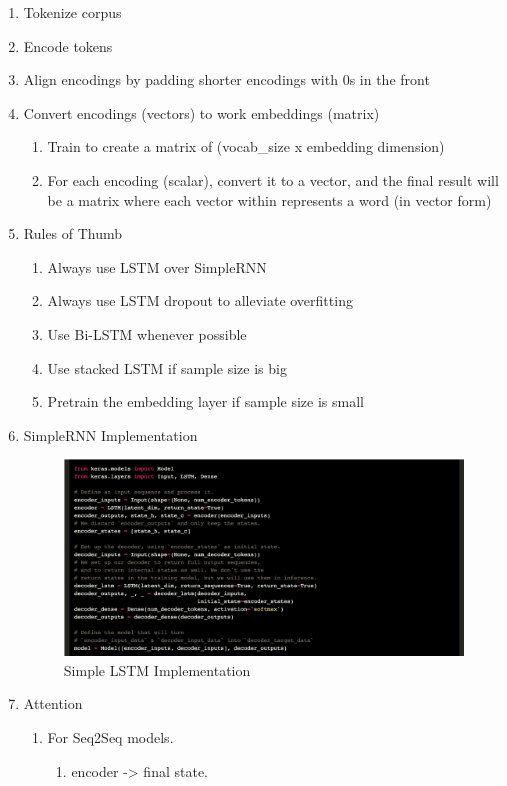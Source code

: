 \documentclass[11pt]{article}
\begin{document}
\begin{enumerate}
\item Tokenize corpus
\item Encode tokens
\item Align encodings by padding shorter encodings with 0s in the front
\item Convert encodings (vectors) to work embeddings (matrix)
\begin{enumerate}
\item Train to create a matrix of (vocab\_size x embedding dimension)
\item For each encoding (scalar), convert it to a vector, and the final result will be a matrix where each vector within represents a word (in vector form)
\end{enumerate}
\item Rules of Thumb
\begin{enumerate}
\item Always use LSTM over SimpleRNN
\item Always use LSTM dropout to alleviate overfitting
\item Use Bi-LSTM whenever possible
\item Use stacked LSTM if sample size is big
\item Pretrain the embedding layer if sample size is small
\end{enumerate}
\item SimpleRNN Implementation
\begin{figure}[htbp]
\centering
\includegraphics[width=.9\linewidth]{./pictures/rnn_keras.png}
\caption{\label{fig:orgb864b81}
Simple LSTM Implementation}
\end{figure}
\item Attention
\begin{enumerate}
\item For Seq2Seq models.
\begin{enumerate}
\item encoder -> final state.

\end{enumerate}
\end{enumerate}
\end{enumerate}
\end{document}
